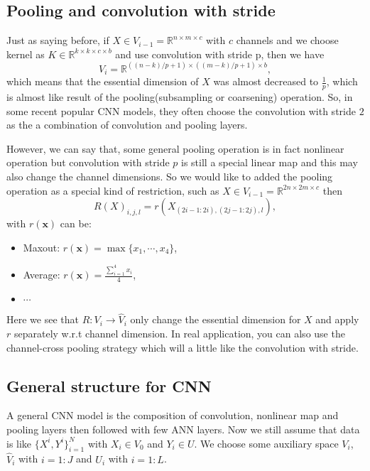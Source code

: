 \subsection{Pooling and convolution with stride}
Just as saying before, if $X \in V_{i-1} = \mathbb{R}^{n \times m \times c }$ with $c$ channels and we choose kernel as $K \in \mathbb{R}^{k\times k \times c \times b}$ and use convolution with stride p, then we have
\begin{equation} 
V_{i} = \mathbb{R}^{((n-k)/p + 1)\times ((m-k)/p+1) \times b},
\end{equation}
which means that the essential dimension of $X$ was almost decreased to $\frac{1}{p}$, which is almost like result of the pooling(subsampling or coarsening) operation. So, in some recent popular CNN models, they often choose the convolution with stride $2$ as the a combination of convolution and pooling layers.

However, we can say that, some general pooling operation is in fact nonlinear operation but convolution with stride $p$ is still a special linear map and this may also change the channel dimensions. So we would like to added the pooling operation as a special kind of restriction, such as $X \in V_{i-1} = \mathbb{R}^{2n \times 2m \times c }$ then 
\begin{equation}
R(X)_{i,j,l} = r(X_{(2i - 1:2i), (2j-1:2j),l}),
\end{equation}
with $r(\bm{x})$ can be:
\begin{itemize}
\item Maxout: $r(\bm{x}) = \max \{x_1, \cdots, x_4\}$,
\item Average: $r(\bm{x}) = \frac{\sum_{i=1}^4 x_i}{4}$,
\item $\cdots$
\end{itemize}
Here we see that $R: V_i \to \hat{V}_i$ only change the essential dimension for $X$ and apply $r$ separately w.r.t channel dimension. In real application, you can also use the channel-cross pooling strategy which will a little like the convolution with stride.

\subsection{General structure for CNN}
A general CNN model is the composition of convolution, nonlinear map and pooling layers then followed with few ANN layers. 
Now we still assume that data is like $\{X^i, Y^i\}_{i=1}^N$ with $X_i \in V_0$ and $Y_i \in U$. We choose some auxiliary space $V_i$, $\hat{V}_i$ with $i = 1:J$ and $U_i$ with $i = 1:L$. 

